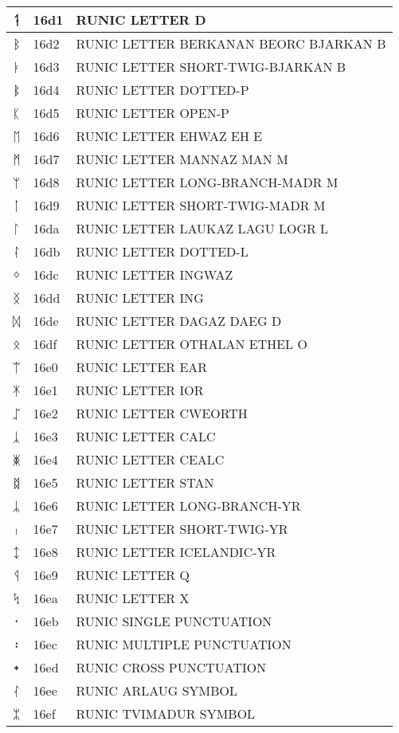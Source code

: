 \documentclass[12pt,letterpaper,openany]{book}
\begin{document}
\begin{center}
\begin{supertabular}{|m{0.25in}|m{0.5in}|m{4in}|}
			ᛑ & 16d1 & RUNIC LETTER D\\\hline
			ᛒ & 16d2 & RUNIC LETTER BERKANAN BEORC BJARKAN B\\\hline
			ᛓ & 16d3 & RUNIC LETTER SHORT-TWIG-BJARKAN B\\\hline
			ᛔ & 16d4 & RUNIC LETTER DOTTED-P\\\hline
			ᛕ & 16d5 & RUNIC LETTER OPEN-P\\\hline
			ᛖ & 16d6 & RUNIC LETTER EHWAZ EH E\\\hline
			ᛗ & 16d7 & RUNIC LETTER MANNAZ MAN M\\\hline
			ᛘ & 16d8 & RUNIC LETTER LONG-BRANCH-MADR M\\\hline
			ᛙ & 16d9 & RUNIC LETTER SHORT-TWIG-MADR M\\\hline
			ᛚ & 16da & RUNIC LETTER LAUKAZ LAGU LOGR L\\\hline
			ᛛ & 16db & RUNIC LETTER DOTTED-L\\\hline
			ᛜ & 16dc & RUNIC LETTER INGWAZ\\\hline
			ᛝ & 16dd & RUNIC LETTER ING\\\hline
			ᛞ & 16de & RUNIC LETTER DAGAZ DAEG D\\\hline
			ᛟ & 16df & RUNIC LETTER OTHALAN ETHEL O\\\hline
			ᛠ & 16e0 & RUNIC LETTER EAR\\\hline
			ᛡ & 16e1 & RUNIC LETTER IOR\\\hline
			ᛢ & 16e2 & RUNIC LETTER CWEORTH\\\hline
			ᛣ & 16e3 & RUNIC LETTER CALC\\\hline
			ᛤ & 16e4 & RUNIC LETTER CEALC\\\hline
			ᛥ & 16e5 & RUNIC LETTER STAN\\\hline
			ᛦ & 16e6 & RUNIC LETTER LONG-BRANCH-YR\\\hline
			ᛧ & 16e7 & RUNIC LETTER SHORT-TWIG-YR\\\hline
			ᛨ & 16e8 & RUNIC LETTER ICELANDIC-YR\\\hline
			ᛩ & 16e9 & RUNIC LETTER Q\\\hline
			ᛪ & 16ea & RUNIC LETTER X\\\hline
			᛫ & 16eb & RUNIC SINGLE PUNCTUATION\\\hline
			᛬ & 16ec & RUNIC MULTIPLE PUNCTUATION\\\hline
			᛭ & 16ed & RUNIC CROSS PUNCTUATION\\\hline
			ᛮ & 16ee & RUNIC ARLAUG SYMBOL\\\hline
			ᛯ & 16ef & RUNIC TVIMADUR SYMBOL\\\hline

\end{supertabular}
\end{center}
\end{document}
